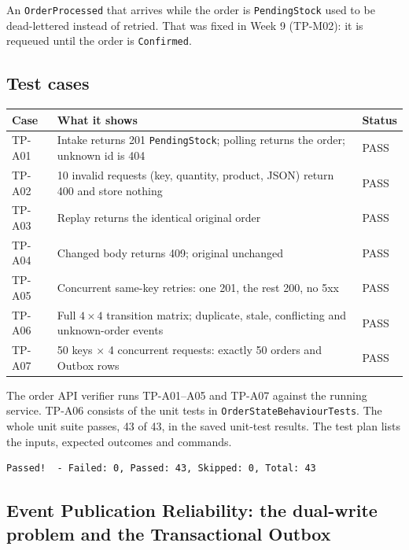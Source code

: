 \documentclass[a4paper]{report}
\begin{document}
An \texttt{OrderProcessed} that arrives while the order is
\texttt{PendingStock} used to be dead-lettered instead of retried. That was
fixed in Week 9 (TP-M02): it is requeued until the order is
\texttt{Confirmed}.

\subsection{Test cases}

\begin{center}
\begin{tabular}{@{}lp{7.6cm}l@{}}
\toprule
Case & What it shows & Status \\
\midrule
TP-A01 & Intake returns 201 \texttt{PendingStock}; polling returns the order; unknown id is 404 & PASS \\
TP-A02 & 10 invalid requests (key, quantity, product, JSON) return 400 and store nothing & PASS \\
TP-A03 & Replay returns the identical original order & PASS \\
TP-A04 & Changed body returns 409; original unchanged & PASS \\
TP-A05 & Concurrent same-key retries: one 201, the rest 200, no 5xx & PASS \\
TP-A06 & Full $4\times4$ transition matrix; duplicate, stale, conflicting and unknown-order events & PASS \\
TP-A07 & 50 keys $\times$ 4 concurrent requests: exactly 50 orders and Outbox rows & PASS \\
\bottomrule
\end{tabular}
\end{center}

The order API verifier runs TP-A01--A05 and TP-A07
against the running service. TP-A06 consists of the unit tests in
\texttt{OrderStateBehaviourTests}. The whole unit suite passes, 43 of 43, in
the saved unit-test results. The test plan lists the inputs, expected
outcomes and commands.

\begin{Verbatim}[breaklines=true,breakanywhere=true,fontsize=\footnotesize]
Passed!  - Failed: 0, Passed: 43, Skipped: 0, Total: 43
\end{Verbatim}

\subsection{Event Publication Reliability: the dual-write problem and the Transactional Outbox}
\label{sec:outbox}
\end{document}

